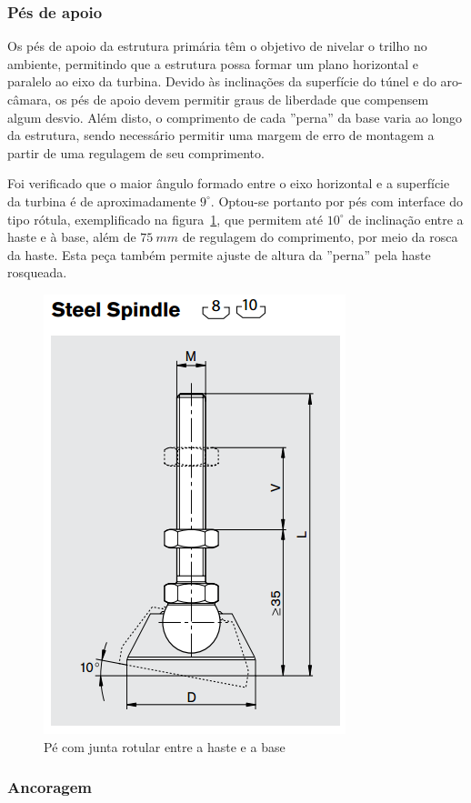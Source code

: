 \subsubsection{Pés de apoio}

Os pés de apoio da estrutura primária têm o objetivo de nivelar o trilho no
ambiente, permitindo que a estrutura possa formar um plano horizontal e paralelo
ao eixo da turbina. Devido às inclinações da superfície do túnel e do
aro-câmara, os pés de apoio devem permitir graus de liberdade que compensem
algum desvio. Além disto, o comprimento de cada ''perna'' da base varia ao
longo da estrutura, sendo necessário permitir uma margem de erro de
montagem a partir de uma regulagem de seu comprimento.

Foi verificado que o maior ângulo formado entre o eixo horizontal e a superfície
da turbina é de aproximadamente $9^{\circ}$. Optou-se portanto por pés com
interface do tipo rótula, exemplificado na figura~\ref{fig::spindle}, que
permitem até $10^{\circ}$ de inclinação entre a haste e à base, além de $75~mm$ de regulagem
do comprimento, por meio da rosca da haste. Esta peça também permite ajuste de
altura da ''perna'' pela haste rosqueada. %

\begin{figure}[h!]
	\centering
	\includegraphics[width=0.4\columnwidth]{figs/construcao/spindle}
	\caption{Pé com junta rotular entre a haste e a base}
    \label{fig::spindle}
\end{figure}

\subsubsection{Ancoragem}

